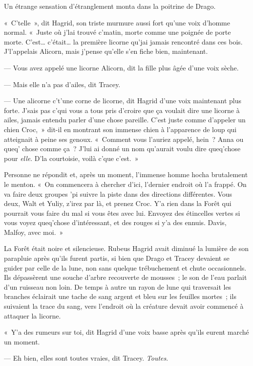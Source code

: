 Un étrange sensation d'étranglement monta dans la poitrine de Drago.

«~C'telle~», dit Hagrid, son triste murmure aussi fort qu'une voix d'homme normal. «~Juste où j'lai trouvé c'matin, morte comme une poignée de porte morte. C'est… c'était… la première licorne qu'jai jamais rencontré dans ces bois. J'l'appelais Alicorn, mais j'pense qu'elle s'en fiche bien, maintenant.

--- Vous avez appelé une licorne Alicorn, dit la fille plus âgée d'une voix sèche.

--- Mais elle n'a pas d'ailes, dit Tracey.

--- Une alicorne c't'une corne de licorne, dit Hagrid d'une voix maintenant plus forte. J'sais pas c'qui vous a tous pris d'croire que ça voulait dire une licorne à ailes, jamais entendu parler d'une chose pareille. C'est juste comme d'appeler un chien Croc,~» dit-il en montrant son immense chien à l'apparence de loup qui atteignait à peine ses genoux. «~Comment vous l'auriez appelé, hein~? Anna ou queq' chose comme ça~? J'lui ai donné un nom qu'aurait voulu dire queq'chose pour \emph{elle}. D'la courtoisie, voilà c'que c'est.~»

Personne ne répondit et, après un moment, l'immense homme hocha brutalement le menton. «~On commencera à chercher d'ici, l'dernier endroit où l'a frappé. On va faire deux groupes 'pi suivre la piste dans des directions différentes. Vous deux, Walt et Yuliy, z'irez par là, et prenez Croc. Y'a rien dans la Forêt qui pourrait vous faire du mal si vous êtes avec lui. Envoyez des étincelles vertes si vous voyez queq'chose d'intéressant, et des rouges si y'a des ennuis. Davis, Malfoy, avec moi.~»

La Forêt était noire et silencieuse. Rubeus Hagrid avait diminué la lumière de son parapluie après qu'ils furent partis, si bien que Drago et Tracey devaient se guider par celle de la lune, non sans quelque trébuchement et chute occasionnels. Ils dépassèrent une souche d'arbre recouverte de mousses~; le son de l'eau parlait d'un ruisseau non loin. De temps à autre un rayon de lune qui traversait les branches éclairait une tache de sang argent et bleu sur les feuilles mortes~; ils suivaient la trace du sang, vers l'endroit où la créature devait avoir commencé à attaquer la licorne.

«~Y'a des rumeurs sur toi, dit Hagrid d'une voix basse après qu'ils eurent marché un moment.

--- Eh bien, elles sont toutes vraies, dit Tracey. \emph{Toutes}.

